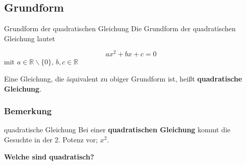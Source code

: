 










\subsection{Grundform}

\begin{definition}{Grundform der quadratischen Gleichung}{}
  Die Grundform der quadratischen Gleichung lautet

  $$ax^2+bx+c=0$$
  mit $a\in \mathbb{R}\backslash\{0\}$, $b, c \in \mathbb{R}$

  Eine Gleichung, die äquivalent zu obiger Grundform ist, heißt
  \textbf{quadratische Gleichung}.
\end{definition}

\subsubsection{Bemerkung}

\begin{bemerkung}{quadratische Gleichung}{}
  Bei einer \textbf{quadratischen Gleichung} kommt die Gesuchte
  in der 2. Potenz vor; \zB $x^2$.
\end{bemerkung}

\textbf{Welche sind quadratisch?}

